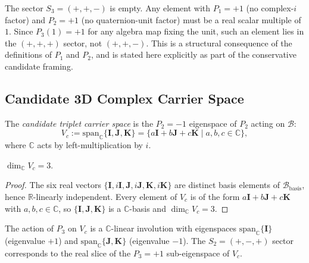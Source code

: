 \begin{remark}[Emptiness of $S_3$]
  The sector $S_3 = (+,+,-)$ is empty.
  Any element with $P_1 = +1$ (no complex-$i$ factor) and $P_2 = +1$
  (no quaternion-unit factor) must be a real scalar multiple of $1$.
  Since $P_3(1) = +1$ for any algebra map fixing the unit, such an element
  lies in the $(+,+,+)$ sector, not $(+,+,-)$.
  This is a structural consequence of the definitions of $P_1$ and $P_2$,
  and is stated here explicitly as part of the conservative candidate framing.
\end{remark}

\subsection{Candidate 3D Complex Carrier Space}
\label{subsec:inv:carrier_space}

\begin{definition}
  \label{def:inv:Vc}
  The \emph{candidate triplet carrier space} is the $P_2 = -1$ eigenspace of
  $P_2$ acting on $\mathcal{B}$:
  \begin{equation}
    V_c := \mathrm{span}_\mathbb{C}\{\mathbf{I}, \mathbf{J}, \mathbf{K}\}
         = \{a\mathbf{I} + b\mathbf{J} + c\mathbf{K} \mid a, b, c \in \mathbb{C}\},
    \label{eq:inv:Vc}
  \end{equation}
  where $\mathbb{C}$ acts by left-multiplication by $i$.
\end{definition}

\begin{lemma}
  \label{lem:Vc_dim}
  $\dim_\mathbb{C} V_c = 3$.
\end{lemma}

\begin{proof}
  The six real vectors $\{\mathbf{I}, i\mathbf{I}, \mathbf{J}, i\mathbf{J},
  \mathbf{K}, i\mathbf{K}\}$ are distinct basis elements of
  $\mathcal{B}_\mathrm{basis}$, hence $\mathbb{R}$-linearly independent.
  Every element of $V_c$ is of the form $a\mathbf{I} + b\mathbf{J} + c\mathbf{K}$
  with $a, b, c \in \mathbb{C}$, so $\{\mathbf{I}, \mathbf{J}, \mathbf{K}\}$
  is a $\mathbb{C}$-basis and $\dim_\mathbb{C} V_c = 3$.
\end{proof}

The action of $P_3$ on $V_c$ is a $\mathbb{C}$-linear involution with
eigenspaces $\mathrm{span}_\mathbb{C}\{\mathbf{I}\}$ (eigenvalue $+1$) and
$\mathrm{span}_\mathbb{C}\{\mathbf{J}, \mathbf{K}\}$ (eigenvalue $-1$).
The $S_2 = (+,-,+)$ sector corresponds to the real slice of the
$P_3 = +1$ sub-eigenspace of $V_c$.

